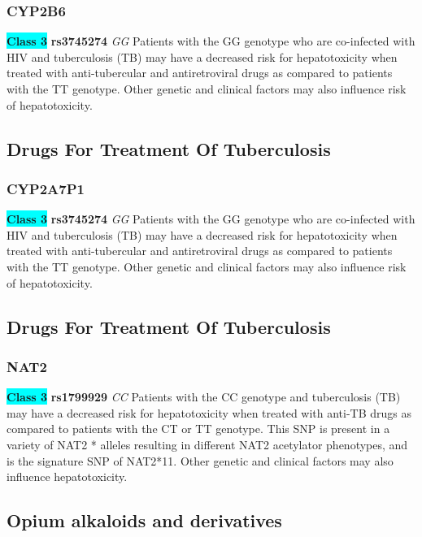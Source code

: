 \documentclass{book}
\begin{document}
\subsubsection{ CYP2B6 }

\begin{center}
\textbf{\colorbox{cyan} {Class 3}} \textbf{ rs3745274 } \textit{ GG }
Patients with the GG genotype who are co-infected with HIV and tuberculosis (TB) may have a decreased risk for hepatotoxicity when treated with anti-tubercular and antiretroviral drugs as compared to patients with the TT genotype. Other genetic and clinical factors may also influence risk of hepatotoxicity.


\end{center}\subsection{ Drugs For Treatment Of Tuberculosis }


\subsubsection{ CYP2A7P1 }

\begin{center}
\textbf{\colorbox{cyan} {Class 3}} \textbf{ rs3745274 } \textit{ GG }
Patients with the GG genotype who are co-infected with HIV and tuberculosis (TB) may have a decreased risk for hepatotoxicity when treated with anti-tubercular and antiretroviral drugs as compared to patients with the TT genotype. Other genetic and clinical factors may also influence risk of hepatotoxicity.


\end{center}\subsection{ Drugs For Treatment Of Tuberculosis }


\subsubsection{ NAT2 }

\begin{center}
\textbf{\colorbox{cyan} {Class 3}} \textbf{ rs1799929 } \textit{ CC }
Patients with the CC genotype and tuberculosis (TB) may have a decreased risk for hepatotoxicity when treated with anti-TB drugs as compared to patients with the CT or TT genotype. This SNP is present in a variety of NAT2 * alleles resulting in different NAT2 acetylator phenotypes, and is the signature SNP of NAT2*11. Other genetic and clinical factors may also influence hepatotoxicity.


\end{center}\subsection{ Opium alkaloids and derivatives }
\end{document}
